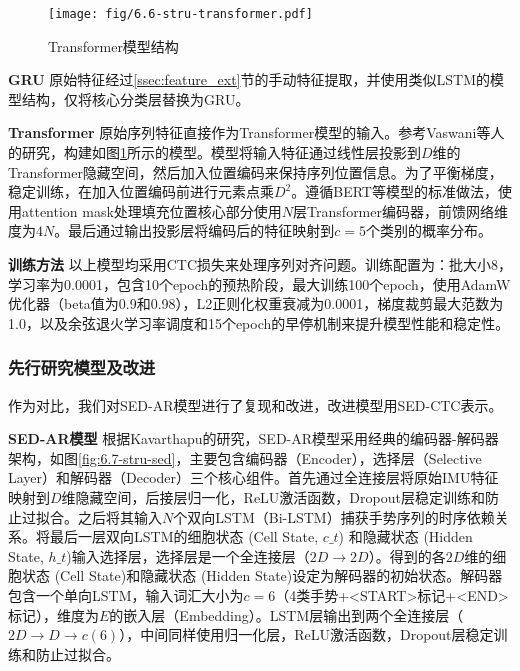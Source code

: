 \begin{figure}
    \centering
    \texttt{[image: fig/6.6-stru-transformer.pdf]}
    \caption{Transformer模型结构}
    \label{fig:6.6-stru-transformer}
\end{figure}

\textbf{GRU}\hspace{5pt} 原始特征经过\ref{ssec:feature_ext}节的手动特征提取，并使用类似LSTM的模型结构，仅将核心分类层替换为GRU。

\textbf{Transformer}\hspace{5pt} 原始序列特征直接作为Transformer模型的输入。参考Vaswani\cites{vaswani2017attention}等人的研究，构建如图\ref{fig:6.6-stru-transformer}所示的模型。模型将输入特征通过线性层投影到$D$维的Transformer隐藏空间，然后加入位置编码来保持序列位置信息。为了平衡梯度，稳定训练，在加入位置编码前进行元素点乘$D^2$。遵循BERT等模型的标准做法，使用attention mask处理填充位置\cites{devlin2019bert}核心部分使用$N$层Transformer编码器，前馈网络维度为$4N$。最后通过输出投影层将编码后的特征映射到$c=5$个类别的概率分布。

\textbf{训练方法}\hspace{5pt} 以上模型均采用CTC损失来处理序列对齐问题。训练配置为：批大小8，学习率为0.0001，包含10个epoch的预热阶段，最大训练100个epoch，使用AdamW优化器（beta值为0.9和0.98），L2正则化权重衰减为0.0001，梯度裁剪最大范数为1.0，以及余弦退火学习率调度和15个epoch的早停机制来提升模型性能和稳定性。

\subsubsection{先行研究模型及改进}\label{sssec:sed_ar_ctc}

作为对比，我们对SED-AR模型进行了复现和改进，改进模型用SED-CTC表示。

\textbf{SED-AR模型}\hspace{5pt} 根据Kavarthapu\cites{kavarthapu2017hand}的研究，SED-AR模型采用经典的编码器-解码器架构，如图\ref{fig:6.7-stru-sed}，主要包含编码器（Encoder），选择层（Selective Layer）和解码器（Decoder）三个核心组件。首先通过全连接层将原始IMU特征映射到$D$维隐藏空间，后接层归一化，ReLU激活函数，Dropout层稳定训练和防止过拟合。之后将其输入$N$个双向LSTM（Bi-LSTM）捕获手势序列的时序依赖关系。将最后一层双向LSTM的细胞状态 (Cell State, $c\_t$)	和隐藏状态 (Hidden State, $h\_t$)输入选择层，选择层是一个全连接层（$2D\to2D$）。得到的各$2D$维的细胞状态 (Cell State)和隐藏状态 (Hidden State)设定为解码器的初始状态。解码器包含一个单向LSTM，输入词汇大小为$c=6$（4类手势+<START>标记+<END>标记），维度为$E$的嵌入层（Embedding）。LSTM层输出到两个全连接层（$2D\to D\to c(6)$），中间同样使用归一化层，ReLU激活函数，Dropout层稳定训练和防止过拟合。

